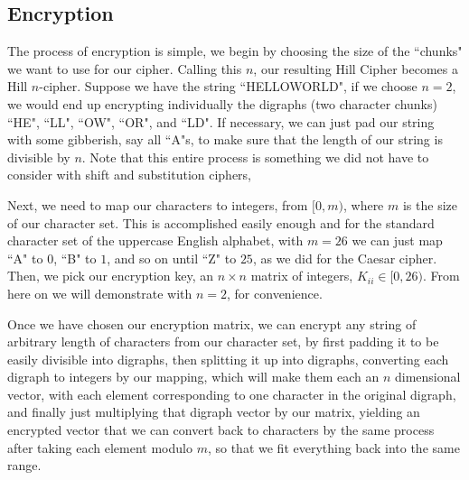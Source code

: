 \documentclass{article}
\begin{document}
\subsection{Encryption}
The process of encryption is simple, we begin by choosing the size of the ``chunks" we want to use for our cipher. Calling this $n$, our resulting Hill Cipher becomes a Hill $n$-cipher. Suppose we have the string ``HELLOWORLD", if we choose $n = 2$, we would end up encrypting individually the digraphs (two character chunks) ``HE", ``LL", ``OW", ``OR", and ``LD". If necessary, we can just pad our string with some gibberish, say all ``A"s, to make sure that the length of our string is divisible by $n$. Note that this entire process is something we did not have to consider with shift and substitution ciphers,  \medskip

\noindent Next, we need to map our characters to integers, from $[0, m)$, where $m$ is the size of our character set. This is accomplished easily enough and for the standard character set of the uppercase English alphabet, with $m = 26$ we can just map ``A" to $0$, ``B" to $1$, and so on until ``Z" to $25$, as we did for the Caesar cipher. Then, we pick our encryption key, an $n \times n$ matrix of integers, $K_{ii} \in [0, 26)$. From here on we will demonstrate with $n = 2$, for convenience. \medskip

\noindent Once we have chosen our encryption matrix, we can encrypt any string of arbitrary length of characters from our character set, by first padding it to be easily divisible into digraphs, then splitting it up into digraphs, converting each digraph to integers by our mapping, which will make them each an $n$ dimensional vector, with each element corresponding to one character in the original digraph, and finally just multiplying that digraph vector by our matrix, yielding an encrypted vector that we can convert back to characters by the same process after taking each element modulo $m$, so that we fit everything back into the same range. \medskip
\end{document}
